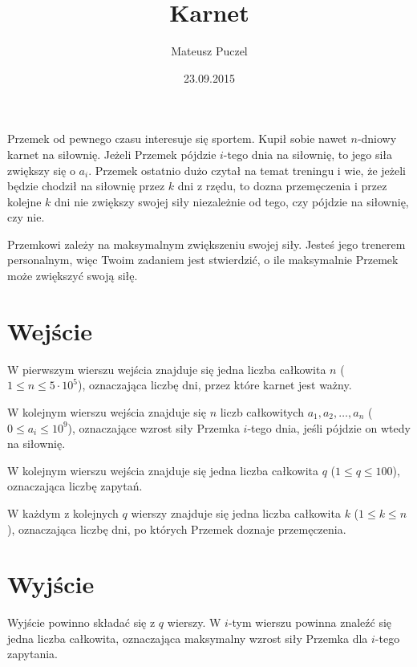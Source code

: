 \documentclass[zad,zawodnik,utf8]{sinol}
\title{Karnet}
\author{Mateusz Puczel}
\date{23.09.2015}
\begin{document}
  \begin{tasktext}%
Przemek od pewnego czasu interesuje się sportem. Kupił sobie nawet $n$-dniowy karnet na siłownię. 
Jeżeli Przemek pójdzie $i$-tego dnia na siłownię, to jego siła zwiększy się o $a_i$.
Przemek ostatnio dużo czytał na temat treningu i wie, że jeżeli będzie chodził na siłownię przez $k$ dni z rzędu, 
to dozna przemęczenia i przez kolejne $k$ dni nie zwiększy swojej siły niezależnie od tego, czy pójdzie na siłownię, czy nie. 

Przemkowi zależy na maksymalnym zwiększeniu swojej siły.
Jesteś jego trenerem personalnym, więc Twoim zadaniem jest stwierdzić, o ile maksymalnie Przemek może zwiększyć swoją siłę.

  \section{Wejście}
W pierwszym wierszu wejścia znajduje się jedna liczba całkowita $n$ ($1 \leq n \leq 5 \cdot 10^5$), 
oznaczająca liczbę dni, przez które karnet jest ważny.

W kolejnym wierszu wejścia znajduje się $n$ liczb całkowitych $a_1, a_2, \ldots, a_n$ ($0 \leq a_i \leq 10^9$), oznaczające wzrost siły Przemka $i$-tego dnia,
jeśli pójdzie on wtedy na siłownię.

W kolejnym wierszu wejścia znajduje się jedna liczba całkowita $q$ ($1 \leq q \leq 100$), oznaczająca liczbę zapytań.

W każdym z kolejnych $q$ wierszy znajduje się jedna liczba całkowita $k$ ($1 \leq k \leq n$), oznaczająca liczbę dni,
po których Przemek doznaje przemęczenia.

  \section{Wyjście}
Wyjście powinno składać się z $q$ wierszy. W $i$-tym wierszu powinna znaleźć się jedna liczba całkowita, oznaczająca maksymalny
wzrost siły Przemka dla $i$-tego zapytania.
    \makecompactexample


  \end{tasktext}
\end{document}
